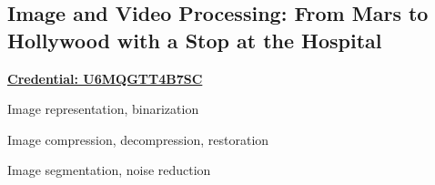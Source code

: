 \subsection{Image and Video Processing: From Mars to Hollywood with a Stop at the Hospital}
\vspace{\topsep}
\href{https://www.coursera.org/account/accomplishments/certificate/U6MQGTT4B7SC}{\bf Credential: U6MQGTT4B7SC}
\begin{tightitemize}
\item Image representation, binarization
\item Image compression, decompression, restoration
\item Image segmentation, noise reduction
\end{tightitemize}

\sectionspace